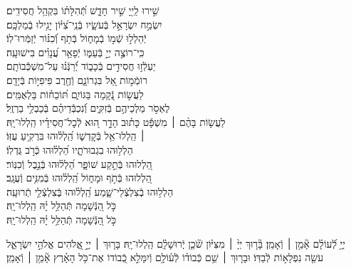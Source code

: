 \documentclass[twoside, openany, parskip=half, 11pt]{book}
\begin{document}
\begin{narrow}
שִׁ֣ירוּ לַֽייָ֭ שִׁ֣יר חָדָ֑שׁ \hfill תְּֿ֝הִלָּת֗וֹ בִּקְהַ֥ל חֲסִידִֽים׃\\
יִשְׂמַ֣ח יִשְׂרָאֵ֣ל בְּֿעֹשָׂ֑יו \hfill בְּֿנֵֽי־צִ֝יּ֗וֹן יָגִ֥ילוּ בְֿמַלְכָּֽם׃\\
יְֿהַלְל֣וּ שְֿׁמ֣וֹ בְֿמָח֑וֹל \hfill בְּֿתֹ֥ף וְֿ֝כִנּ֗וֹר יְֿזַמְּֿרוּ־לֽוֹ׃\\
כִּֽי־רוֹצֶ֣ה יְיָ֣ בְּֿעַמּ֑וֹ \hfill יְֿפָאֵ֥ר עֲ֝נָוִ֗ים בִּישׁוּעָֽה׃\\
יַעְלְֿז֣וּ חֲסִידִ֣ים בְּֿכָב֑וֹד \hfill יְֿ֝רַנְּֿנ֗וּ עַל־מִשְׁכְּֿֿבוֹתָֽם׃\\
רוֹמְֿמ֣וֹת אֵ֭ל בִּגְרוֹנָ֑ם \hfill וְֿחֶ֖רֶב פִּיפִיּ֣וֹת בְּֿיָדָֽם׃\\
לַעֲשׂ֣וֹת נְֿ֭קָמָה בַּגּוֹיִ֑ם \hfill תּ֝וֹכֵח֗וֹת בַּלְאֻמִּֽים׃\\
לֶאְסֹ֣ר מַלְכֵיהֶ֣ם בְּֿזִקִּ֑ים \hfill וְֿ֝נִכְבְּֿֿדֵיהֶ֗ם בְּֿכַבְלֵ֥י בַרְזֶֽל׃\\
לַעֲשׂ֤וֹת בָּהֶ֨ם ׀ מִשְׁפָּ֬ט כָּת֗וּב \hfill הָדָ֣ר ה֭וּא לְֿכׇל־חֲסִידָ֗יו הַֽלְלוּ־יָֽהּ׃\\


 ׀ \hfill \break
הַֽלְלוּ־אֵ֥ל בְּֿקׇדְשׁ֑וֹ \hfill הַֽ֝לְל֗וּהוּ בִּרְקִ֥יעַ עֻזּֽוֹ׃\\
הַלְל֥וּהוּ בִגְבוּרֹתָ֑יו \hfill הַ֝לְל֗וּהוּ כְּֿרֹ֣ב גֻּדְלֽוֹ׃\\
הַ֭לְלוּהוּ בְּֿתֵ֣קַע שׁוֹפָ֑ר \hfill הַ֝לְל֗וּהוּ בְּֿנֵ֣בֶל וְֿכִנּֽוֹר׃\\
הַ֭לְלוּהוּ בְּֿתֹ֣ף וּמָח֑וֹל \hfill הַֽ֝לְל֗וּהוּ בְּֿמִנִּ֥ים וְֿעֻגָֽב׃\\
הַלְל֥וּהוּ בְֿצִלְצְֿלֵי־שָׁ֑מַע \hfill הַֽ֝לְל֗וּהוּ בְּֽֿצִלְצְֿלֵ֥י תְֿרוּעָֽה׃\\
כֹּ֣ל הַ֭נְּֿשָׁמָה תְּֿהַלֵּ֥ל יָ֗הּ \hfill הַֽלְלוּ־יָֽהּ׃\\
\scriptsize{כֹּ֣ל הַ֭נְּֿשָׁמָה תְּֿהַלֵּ֥ל יָ֗הּ \hfill הַֽלְלוּ־יָֽהּ׃ \\}
\normalsize{}

\end{narrow}

\negline

יְיָ֥ לְֿ֝עוֹלָ֗ם אָ֘מֵ֥ן ׀ וְֿאָמֵֽן׃ \hfill \break
{}בָּ֘ר֤וּךְ יְיָ֨ ׀ מִצִּיּ֗וֹן שֹׁ֘כֵ֤ן יְֽֿרוּשָׁלָ֗‍ִם הַֽלְלוּ־יָֽהּ׃ \hfill \break
{}בָּר֤וּךְ ׀ יְיָ֣ אֱ֭לֹהִים אֱלֹהֵ֣י יִשְׂרָאֵ֑ל עֹשֵׂ֖ה נִפְלָא֣וֹת לְֿבַדּֽוֹ׃ \hfill \break
וּבָר֤וּךְ ׀ שֵׁ֥ם כְּֿבוֹד֗וֹ לְֿע֫וֹלָ֥ם וְֿיִמָּלֵ֣א כְֿ֭בוֹדוֹ אֶת־כֹּ֥ל הָאָ֗רֶץ אָ֘מֵ֥ן ׀ וְֿאָמֵֽן׃
\end{document}
